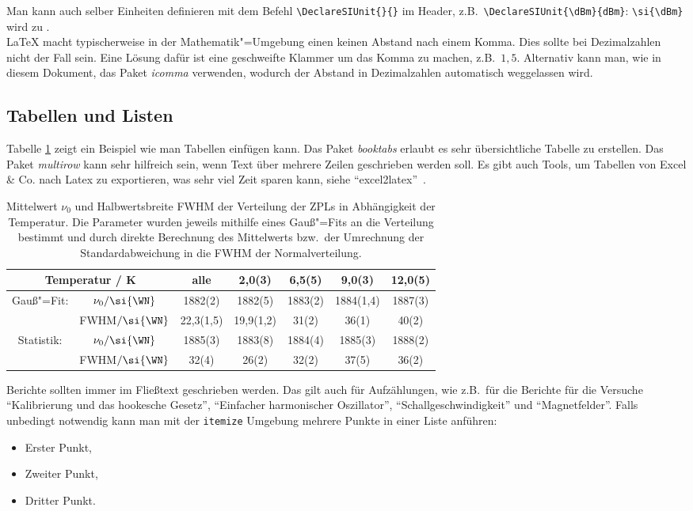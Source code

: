 Man kann auch selber Einheiten definieren mit dem Befehl \verb"\DeclareSIUnit{}{}" im Header, z.B.\  \verb"\DeclareSIUnit{\dBm}{dBm}": \verb"\si{\dBm}" wird zu \si{\dBm}.\\
\LaTeX{} macht typischerweise in der Mathematik"=Umgebung einen keinen Abstand nach einem Komma. Dies sollte bei Dezimalzahlen nicht der Fall sein. Eine Lösung dafür ist eine geschweifte Klammer um das Komma zu machen, z.B.\ $1{,}5$. Alternativ kann man, wie in diesem Dokument, das Paket \textit{icomma} verwenden, wodurch der Abstand in Dezimalzahlen automatisch weggelassen wird.
\subsection{Tabellen und Listen}
\label{subsec:Tabellen}

Tabelle \ref{tab:TempabhVerteilung} zeigt ein Beispiel wie man Tabellen einfügen kann. Das Paket \textit{booktabs} erlaubt es sehr übersichtliche Tabelle zu erstellen. Das Paket \textit{multirow} kann sehr hilfreich sein, wenn Text über mehrere Zeilen geschrieben werden soll. Es gibt auch Tools, um Tabellen von Excel \& Co. nach Latex zu exportieren, was sehr viel Zeit sparen kann, siehe "`excel2latex"'~\cite{extolat}.
\begin{table}[htbp]
\centering
\caption{\label{tab:TempabhVerteilung}Mittelwert $\nu_0$ und Halbwertsbreite FWHM der Verteilung der ZPLs in Abhängigkeit der Temperatur. Die Parameter wurden jeweils mithilfe eines Gauß"=Fits an die Verteilung bestimmt und durch direkte Berechnung des Mittelwerts bzw.\ der Umrechnung der Standardabweichung in die FWHM der Normalverteilung.}
\begin{tabular}{ccccccc}
\toprule
\multicolumn{2}{c}{Temperatur / \si{\kelvin}}	& \multicolumn{1}{c}{alle}		& 2,0(3)		& 6,5(5)		& 9,0(3) & 12,0(5) \\
\midrule
\multirow{2}{*}{Gauß"=Fit:} & \multicolumn{1}{c}{$\nu_0/\si{\WN}$}	& 1882(2)		& 1882(5)		& 1883(2) & 1884(1,4) & 1887(3) \\
														&	\multicolumn{1}{c}{FWHM$/\si{\WN}$}		& 22,3(1,5)			& 19,9(1,2)			& 31(2) 	& 36(1) 	& 40(2) \\
\midrule
\multirow{2}{*}{Statistik:} & \multicolumn{1}{c}{$\nu_0/\si{\WN}$}	& 1885(3)		& 1883(8)		& 1884(4) & 1885(3) & 1888(2) \\
														& \multicolumn{1}{c}{FWHM$/\si{\WN}$}		& 32(4)			& 26(2)			& 32(2) 	& 37(5) 	& 36(2) \\
\bottomrule
\end{tabular}
\end{table}
Berichte sollten immer im Fließtext geschrieben werden. Das gilt auch für Aufzählungen, wie z.B.\ für die Berichte für die Versuche "`Kalibrierung und das hookesche Gesetz"', "`Einfacher harmonischer Oszillator"', "`Schallgeschwindigkeit"' und "`Magnetfelder"'. Falls unbedingt notwendig kann man mit der \verb"itemize" Umgebung mehrere Punkte in einer Liste anführen:
\begin{itemize}
    \item Erster Punkt,
    \item Zweiter Punkt,
    \item Dritter Punkt.
\end{itemize}


